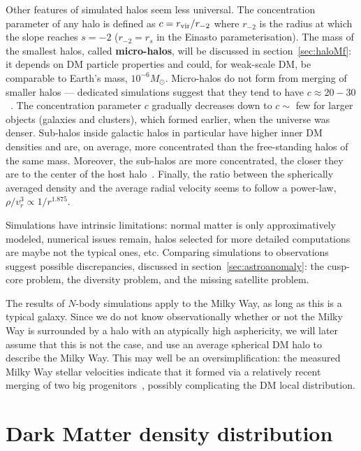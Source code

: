 Other features of simulated halos seem less universal. 
The concentration parameter of any halo is defined as $c=r_{\rm vir}/r_{-2}$
where $r_{-2}$ is the radius at which the slope reaches $s=-2$ ($r_{-2}=r_s$ in the Einasto parameterisation).
The mass of the smallest halos, called {\bf micro-halos}, 
will be discussed in section~\ref{sec:haloMf}: it depends on DM particle properties
and could, for weak-scale DM, be comparable to Earth's mass, $10^{-6}M_\odot$.
Micro-halos do not form from merging of smaller halos ---
dedicated simulations suggest that they tend to have $c\approx 20-30$~\cite{MinimalHaloMassandFS}.
The concentration parameter $c$ gradually decreases down to $c\sim$ few  for larger objects (galaxies and clusters), 
which formed earlier, when the universe was denser.
Sub-halos inside galactic halos in particular have higher inner DM densities and are, on average, more concentrated than the free-standing halos of the same mass. Moreover, the sub-halos are more concentrated, the closer they are to the center of the host halo~\cite{subhaloproperties}.
Finally, the ratio between the spherically averaged density and the average radial velocity seems to follow a power-law, $\rho/v_r^3 \propto 1/r^{1.875}$.


Simulations have intrinsic limitations: normal matter is only approximatively modeled,
numerical issues remain,  halos selected for more detailed computations are maybe not the typical ones, etc.
Comparing simulations to observations suggest possible discrepancies, discussed in section~\ref{sec:astroanomaly}:
the cusp-core problem, the diversity problem,  and the missing satellite problem.
 
 \smallskip
 
The results of $N$-body simulations apply to the Milky Way, as long as this is a typical galaxy.
Since we do not know observationally whether or not the Milky Way is surrounded by a halo with an atypically high asphericity, we will later assume that this is not the case, and use an average spherical DM halo to describe the Milky Way.
This may well be an oversimplification: the measured Milky Way stellar velocities indicate that it formed via a relatively recent merging of two big progenitors~\cite{1804.09365,1807.02519}, possibly complicating the DM local distribution.




\section{Dark Matter density distribution}\label{sec:DMdistribution}

